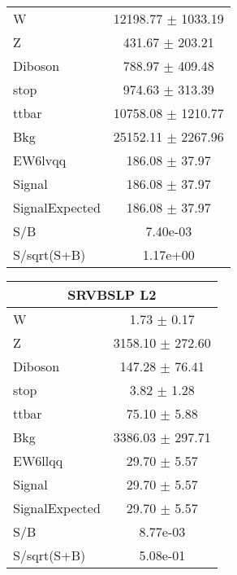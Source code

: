 \begin{table} [h]
{\begin{tabular}{|l|c|}
W & 12198.77 $\pm$ 1033.19\\
Z & 431.67 $\pm$ 203.21\\
Diboson & 788.97 $\pm$ 409.48\\
stop & 974.63 $\pm$ 313.39\\
ttbar & 10758.08 $\pm$ 1210.77\\
\hline
Bkg & 25152.11 $\pm$ 2267.96\\
\hline
EW6lvqq & 186.08 $\pm$ 37.97\\
\hline
Signal & 186.08 $\pm$ 37.97\\
SignalExpected & 186.08 $\pm$ 37.97\\
\hline
S/B & 7.40e-03\\
S/sqrt(S+B) & 1.17e+00\\ \hline
\end{tabular}
\begin{tabular}{|l|c|}
\hline
\multicolumn{2}{|c|}{SRVBSLP L2}\\ \hline
W & 1.73 $\pm$ 0.17\\
Z & 3158.10 $\pm$ 272.60\\
Diboson & 147.28 $\pm$ 76.41\\
stop & 3.82 $\pm$ 1.28\\
ttbar & 75.10 $\pm$ 5.88\\
\hline
Bkg & 3386.03 $\pm$ 297.71\\
\hline
EW6llqq & 29.70 $\pm$ 5.57\\
\hline
Signal & 29.70 $\pm$ 5.57\\
SignalExpected & 29.70 $\pm$ 5.57\\
\hline
S/B & 8.77e-03\\
S/sqrt(S+B) & 5.08e-01\\ \hline
\end{tabular}
}
\end{table}

